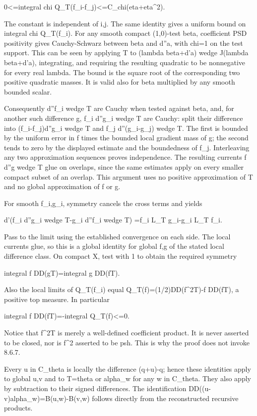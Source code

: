 \documentclass[11pt]{article}
\begin{document}
0<=integral chi Q\_T(f\_i-f\_j)<=C\_chi(eta+eta\textasciicircum{}2).

The constant is independent of i,j. The same identity gives a uniform bound on integral chi Q\_T(f\_i). For any smooth compact (1,0)-test beta, coefficient PSD positivity gives Cauchy-Schwarz between beta and d''a, with chi=1 on the test support. This can be seen by applying T to (lambda beta+d'a) wedge J(lambda beta+d'a), integrating, and requiring the resulting quadratic to be nonnegative for every real lambda. The bound is the square root of the corresponding two positive quadratic masses. It is valid also for beta multiplied by any smooth bounded scalar.

Consequently d''f\_i wedge T are Cauchy when tested against beta, and, for another such difference g, f\_i d''g\_i wedge T are Cauchy: split their difference into (f\_i-f\_j)d''g\_i wedge T and f\_j d''(g\_i-g\_j) wedge T. The first is bounded by the uniform error in f times the bounded local gradient mass of g; the second tends to zero by the displayed estimate and the boundedness of f\_j. Interleaving any two approximation sequences proves independence. The resulting currents f d''g wedge T glue on overlaps, since the same estimates apply on every smaller compact subset of an overlap. This argument uses no positive approximation of T and no global approximation of f or g.

For smooth f\_i,g\_i, symmetry cancels the cross terms and yields

d'(f\_i d''g\_i wedge T-g\_i d''f\_i wedge T)
    =f\_i L\_T g\_i-g\_i L\_T f\_i.

Pass to the limit using the established convergence on each side. The local currents glue, so this is a global identity for global f,g of the stated local difference class. On compact X, test with 1 to obtain the required symmetry

integral f DD(gT)=integral g DD(fT).

Also the local limits of Q\_T(f\_i) equal Q\_T(f)=(1/2)DD(f\textasciicircum{}2T)-f DD(fT), a positive top measure. In particular

integral f DD(fT)=-integral Q\_T(f)<=0.

Notice that f\textasciicircum{}2T is merely a well-defined coefficient product. It is never asserted to be closed, nor is f\textasciicircum{}2 asserted to be psh. This is why the proof does not invoke 8.6.7.

Every u in C\_theta is locally the difference (q+u)-q; hence these identities apply to global u,v and to T=theta or alpha\_w for any w in C\_theta. They also apply by subtraction to their signed differences. The identification DD((u-v)alpha\_w)=B(u,w)-B(v,w) follows directly from the reconstructed recursive products.
\end{document}
